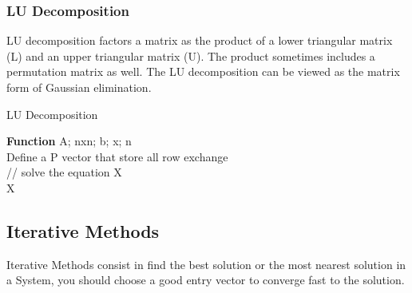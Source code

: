 \documentclass[letterpaper,12pt]{article}
\begin{document}
\subsubsection{LU Decomposition}

LU decomposition factors a matrix as the product of a lower triangular matrix (L) and an upper triangular matrix (U). The product sometimes includes a permutation matrix as well. The LU decomposition can be viewed as the matrix form of Gaussian elimination. 

\begin{center}
\begin{algorithm}[H]
   \caption{LU Decomposition}
   \textbf{Function} A; nxn; b; x; n\\
   Define a P vector that store all row exchange\\
   // solve the equation X\\
   \Return X
  \end{algorithm}  
\end{center}

\subsection{Iterative Methods}

Iterative Methods consist in find the best solution or the most nearest solution in a System, you should choose a good entry vector to converge fast to the solution.
\end{document}
